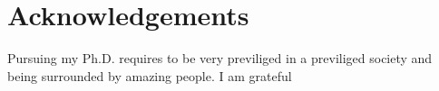 \chapter*{Acknowledgements}
\label{acknowledgements}

Pursuing my Ph.D. requires to be very previliged in a previliged society and
being surrounded by amazing people. I am grateful 

